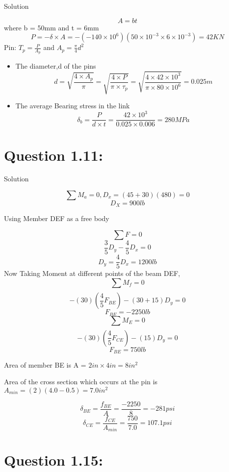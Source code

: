 \documentclass{article}
\begin{document}
\begin{center} Solution \end{center}
\[A = bt\]
where b = 50mm and t = 6mm
\[P = -\delta \times A = -(-140 \times 10^{6})(50 \times 10^{-3} \times 6 \times 10^{-3}) = 42KN\]
Pin: $ T_{p} = \frac{P}{A_{p}} $ and $A_{p} = \frac{\pi}{4}d^{2}$
\begin{itemize}
\item The diameter,d of the pins
\[d = \sqrt{\frac{4\times A_{p}}{\pi}} = \sqrt{\frac{4\times P}{\pi\times\tau_{p}}} = \sqrt{\frac{4\times 42 \times 10^{3}}{\pi \times 80 \times 10^{6}}} = 0.025m\]
\item The average Bearing stress in the link
\[\delta_{b} = \frac{P}{d\times t} = \frac{42\times10^{3}}{0.025\times0.006} = 280MPa\]
\end{itemize}




\section*{\textbf{Question 1.11:}}

\begin{center} Solution \end{center}


\[\sum{}M_{a} = 0, D_{x} = (45 + 30)(480) = 0\]
\[ D_{X} = 900lb \]
\begin{center} Using Member DEF as a free body \end{center}
\[\sum{}F = 0\]
\[\frac{3}{5}D_{y} - \frac{4}{5}D_{x} = 0\]
\[D_{y} = \frac{4}{5}D_{x} = 1200lb\]
Now Taking Moment at different points of the beam DEF,
\[\sum_{} M_{f} = 0 \]   \[-(30)(\frac{4}{5}F_{BE}) - (30+15)D_{y} = 0\]    \[F_{BE} = -2250lb \]
\[\sum_{} M_{E} = 0 \]   \[-(30)(\frac{4}{5}F_{CE}) - (15)D_{y} = 0\]    \[F_{BE} = 750lb \]


Area of member BE is A = $2in \times 4in = 8in^{2}$

Area of the cross section which occurs at the pin is $A_{min} = (2)(4.0-0.5)=7.0in^{2}$

\[\delta_{BE} = \frac{f_{BE}}{A} = \frac{-2250}{8}= -281psi\]
\[\delta_{CE} = \frac{f_{CE}}{A_{min}} = \frac{750}{7.0}= 107.1psi\]





\section*{\textbf{Question 1.15:}}
\end{document}
